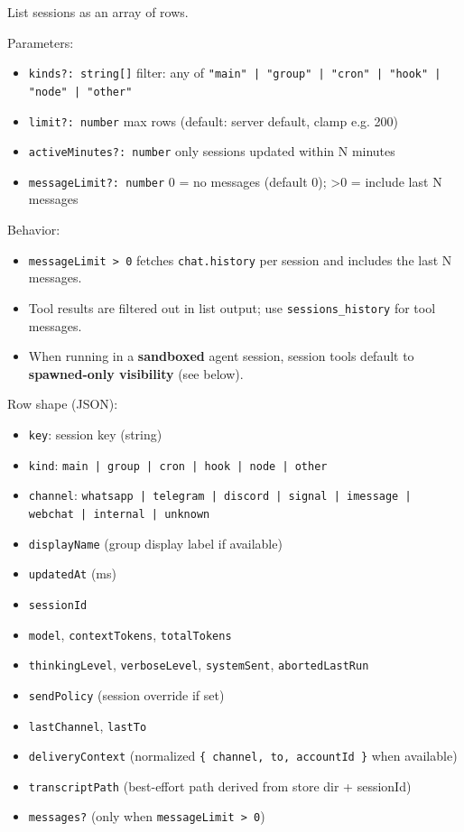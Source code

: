 List sessions as an array of rows.

Parameters:

\begin{itemize}
  \item \texttt{kinds?: string[]} filter: any of \texttt{"main" | "group" | "cron" | "hook" | "node" | "other"}
  \item \texttt{limit?: number} max rows (default: server default, clamp e.g. 200)
  \item \texttt{activeMinutes?: number} only sessions updated within N minutes
  \item \texttt{messageLimit?: number} 0 = no messages (default 0); >0 = include last N messages
\end{itemize}


Behavior:

\begin{itemize}
  \item \texttt{messageLimit > 0} fetches \texttt{chat.history} per session and includes the last N messages.
  \item Tool results are filtered out in list output; use \texttt{sessions\_history} for tool messages.
  \item When running in a \textbf{sandboxed} agent session, session tools default to \textbf{spawned-only visibility} (see below).
\end{itemize}


Row shape (JSON):

\begin{itemize}
  \item \texttt{key}: session key (string)
  \item \texttt{kind}: \texttt{main | group | cron | hook | node | other}
  \item \texttt{channel}: \texttt{whatsapp | telegram | discord | signal | imessage | webchat | internal | unknown}
  \item \texttt{displayName} (group display label if available)
  \item \texttt{updatedAt} (ms)
  \item \texttt{sessionId}
  \item \texttt{model}, \texttt{contextTokens}, \texttt{totalTokens}
  \item \texttt{thinkingLevel}, \texttt{verboseLevel}, \texttt{systemSent}, \texttt{abortedLastRun}
  \item \texttt{sendPolicy} (session override if set)
  \item \texttt{lastChannel}, \texttt{lastTo}
  \item \texttt{deliveryContext} (normalized \texttt{\{ channel, to, accountId \}} when available)
  \item \texttt{transcriptPath} (best-effort path derived from store dir + sessionId)
  \item \texttt{messages?} (only when \texttt{messageLimit > 0})
\end{itemize}


